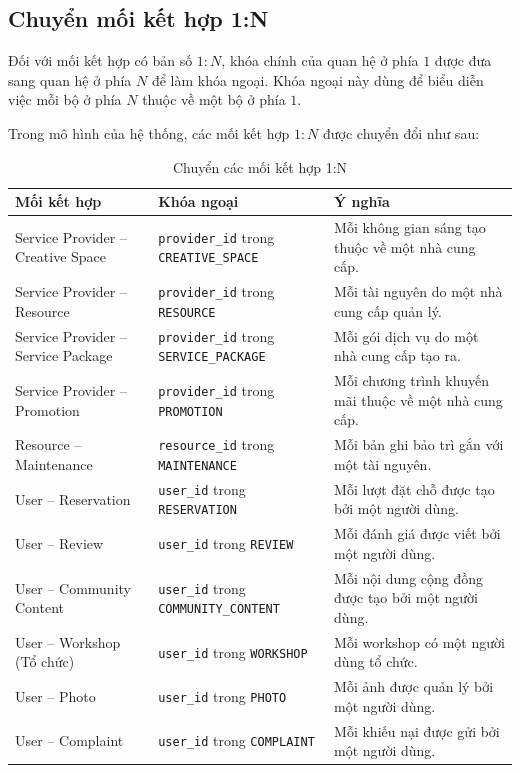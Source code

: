 \subsection{Chuyển mối kết hợp 1:N}

Đối với mối kết hợp có bản số \(1:N\), khóa chính của quan hệ ở phía \(1\) được đưa sang quan hệ ở phía \(N\) để làm khóa ngoại. Khóa ngoại này dùng để biểu diễn việc mỗi bộ ở phía \(N\) thuộc về một bộ ở phía \(1\).

Trong mô hình của hệ thống, các mối kết hợp \(1:N\) được chuyển đổi như sau:

\begin{table}[htbp]
\centering
\begin{tabular}{|p{3.2cm}|p{3.2cm}|p{5.8cm}|}
\hline
\textbf{Mối kết hợp} & \textbf{Khóa ngoại} & \textbf{Ý nghĩa} \\
\hline
Service Provider -- Creative Space &
\texttt{provider\_id} trong \texttt{CREATIVE\_SPACE} &
Mỗi không gian sáng tạo thuộc về một nhà cung cấp. \\
\hline
Service Provider -- Resource &
\texttt{provider\_id} trong \texttt{RESOURCE} &
Mỗi tài nguyên do một nhà cung cấp quản lý. \\
\hline
Service Provider -- Service Package &
\texttt{provider\_id} trong \texttt{SERVICE\_PACKAGE} &
Mỗi gói dịch vụ do một nhà cung cấp tạo ra. \\
\hline
Service Provider -- Promotion &
\texttt{provider\_id} trong \texttt{PROMOTION} &
Mỗi chương trình khuyến mãi thuộc về một nhà cung cấp. \\
\hline
Resource -- Maintenance &
\texttt{resource\_id} trong \texttt{MAINTENANCE} &
Mỗi bản ghi bảo trì gắn với một tài nguyên. \\
\hline
User -- Reservation &
\texttt{user\_id} trong \texttt{RESERVATION} &
Mỗi lượt đặt chỗ được tạo bởi một người dùng. \\
\hline
User -- Review &
\texttt{user\_id} trong \texttt{REVIEW} &
Mỗi đánh giá được viết bởi một người dùng. \\
\hline
User -- Community Content &
\texttt{user\_id} trong \texttt{COMMUNITY\_CONTENT} &
Mỗi nội dung cộng đồng được tạo bởi một người dùng. \\
\hline
User -- Workshop (Tổ chức) &
\texttt{user\_id} trong \texttt{WORKSHOP} &
Mỗi workshop có một người dùng tổ chức. \\
\hline
User -- Photo &
\texttt{user\_id} trong \texttt{PHOTO} &
Mỗi ảnh được quản lý bởi một người dùng. \\
\hline
User -- Complaint &
\texttt{user\_id} trong \texttt{COMPLAINT} &
Mỗi khiếu nại được gửi bởi một người dùng. \\
\hline
\end{tabular}
\caption{Chuyển các mối kết hợp 1:N}
\end{table}

